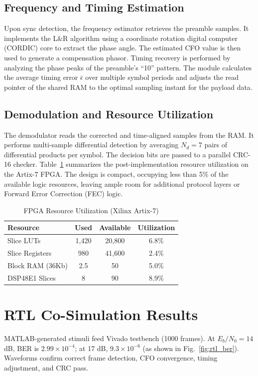 \documentclass[conference]{IEEEtran}
\begin{document}
\subsection{Frequency and Timing Estimation}
Upon sync detection, the frequency estimator retrieves the preamble samples. It implements the L\&R algorithm using a coordinate rotation digital computer (CORDIC) core to extract the phase angle. The estimated CFO value is then used to generate a compensation phasor.
Timing recovery is performed by analyzing the phase peaks of the preamble's ``10'' pattern. The module calculates the average timing error $\bar{\epsilon}$ over multiple symbol periods and adjusts the read pointer of the shared RAM to the optimal sampling instant for the payload data.

\subsection{Demodulation and Resource Utilization}
The demodulator reads the corrected and time-aligned samples from the RAM. It performs multi-sample differential detection by averaging $N_d=7$ pairs of differential products per symbol. The decision bits are passed to a parallel CRC-16 checker.
Table~\ref{tab:resource} summarizes the post-implementation resource utilization on the Artix-7 FPGA. The design is compact, occupying less than 5\% of the available logic resources, leaving ample room for additional protocol layers or Forward Error Correction (FEC) logic.

\begin{table}[h]
\caption{FPGA Resource Utilization (Xilinx Artix-7)}
\label{tab:resource}
\centering
\begin{tabular}{l c c c}
\hline
\textbf{Resource} & \textbf{Used} & \textbf{Available} & \textbf{Utilization} \\
\hline
Slice LUTs & 1,420 & 20,800 & 6.8\% \\
Slice Registers & 980 & 41,600 & 2.4\% \\
Block RAM (36Kb) & 2.5 & 50 & 5.0\% \\
DSP48E1 Slices & 8 & 90 & 8.9\% \\
\hline
\end{tabular}
\end{table}

\section{RTL Co-Simulation Results}
MATLAB-generated stimuli feed Vivado testbench (1000 frames). At $E_b/N_0=14$ dB, BER is $2.99\times10^{-4}$; at 17 dB, $9.3\times10^{-6}$ (as shown in Fig.~\ref{fig:rtl_ber}). Waveforms confirm correct frame detection, CFO convergence, timing adjustment, and CRC pass.
\end{document}
